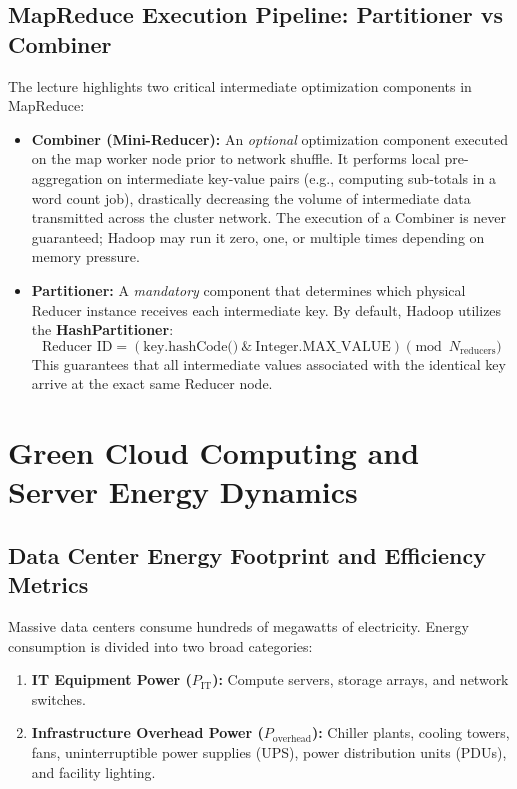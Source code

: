 \documentclass[11pt,a4paper,openany]{report}
\begin{document}
\subsection{MapReduce Execution Pipeline: Partitioner vs Combiner}
The lecture highlights two critical intermediate optimization components in MapReduce:
\begin{itemize}[leftmargin=*]
  \item \textbf{Combiner (Mini-Reducer):} An \emph{optional} optimization component executed on the map worker node prior to network shuffle. It performs local pre-aggregation on intermediate key-value pairs (e.g., computing sub-totals in a word count job), drastically decreasing the volume of intermediate data transmitted across the cluster network. The execution of a Combiner is never guaranteed; Hadoop may run it zero, one, or multiple times depending on memory pressure.
  \item \textbf{Partitioner:} A \emph{mandatory} component that determines which physical Reducer instance receives each intermediate key. By default, Hadoop utilizes the \textbf{HashPartitioner}:
  \begin{equation}
  \text{Reducer ID} = (\text{key.hashCode()} \ \& \ \text{Integer.MAX\_VALUE}) \pmod{N_{\text{reducers}}}
  \end{equation}
  This guarantees that all intermediate values associated with the identical key arrive at the exact same Reducer node.
\end{itemize}

\section{Green Cloud Computing and Server Energy Dynamics}
\subsection{Data Center Energy Footprint and Efficiency Metrics}
Massive data centers consume hundreds of megawatts of electricity. Energy consumption is divided into two broad categories:
\begin{enumerate}[leftmargin=*]
  \item \textbf{IT Equipment Power ($P_{\text{IT}}$):} Compute servers, storage arrays, and network switches.
  \item \textbf{Infrastructure Overhead Power ($P_{\text{overhead}}$):} Chiller plants, cooling towers, fans, uninterruptible power supplies (UPS), power distribution units (PDUs), and facility lighting.
\end{enumerate}
\end{document}
